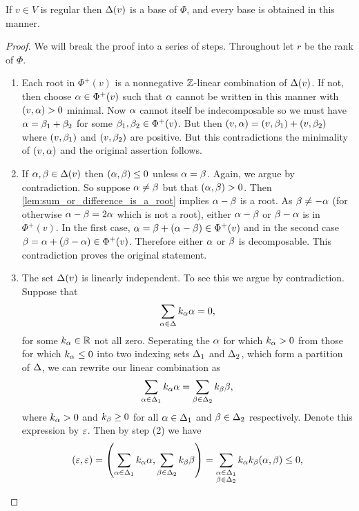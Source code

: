 \documentclass[12pt,reqno,oneside]{amsart}
\begin{document}
    \begin{theorem}\label{thm:root_system_base}
        If $v \in V$ is regular then $\Delta(v)$ is a base of $\Phi$, and every base is obtained in this manner.
    \end{theorem}
    \begin{proof}
        We will break the proof into a series of steps. Throughout let $r$ be the rank of $\Phi$.
        \begin{enumerate}
            \item Each root in $\Phi^{+}(v)$ is a nonnegative $\mathbb{Z}$-linear combination of $\Delta(v)$. If not, then choose $\alpha \in \Phi^{+}(v)$ such that $\alpha$ cannot be written in this manner with $(v,\alpha) > 0$ minimal. Now $\alpha$ cannot itself be indecomposable so we must have $\alpha = \beta_{1}+\beta_{2}$ for some $\beta_{1},\beta_{2} \in \Phi^{+}(v)$. But then $(v,\alpha) = (v,\beta_{1})+(v,\beta_{2})$ where $(v,\beta_{1})$ and $(v,\beta_{2})$ are positive. But this contradictions the minimality of $(v,\alpha)$ and the original assertion follows.
            \item If $\alpha,\beta \in \Delta(v)$ then $(\alpha,\beta) \le 0$ unless $\alpha = \beta$. Again, we argue by contradiction. So suppose $\alpha \neq \beta$ but that $(\alpha,\beta) > 0$. Then \cref{lem:sum_or_difference_is_a_root} implies $\alpha-\beta$ is a root. As $\beta \neq -\alpha$ (for otherwise $\alpha-\beta = 2\alpha$ which is not a root), either $\alpha-\beta$ or $\beta-\alpha$ is in $\Phi^{+}(v)$. In the first case, $\alpha = \beta+(\alpha-\beta) \in \Phi^{+}(v)$ and in the second case $\beta = \alpha+(\beta-\alpha) \in \Phi^{+}(v)$. Therefore either $\alpha$ or $\beta$ is decomposable. This contradiction proves the original statement.
            \item The set $\Delta(v)$ is linearly independent. To see this we argue by contradiction. Suppose that
            \[
                \sum_{\alpha \in \Delta}k_{\alpha}\alpha = 0,
            \]
            for some $k_{\alpha} \in \mathbb{R}$ not all zero. Seperating the $\alpha$ for which $k_{\alpha} > 0$ from those for which $k_{\alpha} \le 0$ into two indexing sets $\Delta_{1}$ and $\Delta_{2}$, which form a partition of $\Delta$, we can rewrite our linear combination as
            \[
                \sum_{\alpha \in \Delta_{1}}k_{\alpha}\alpha = \sum_{\beta \in \Delta_{2}}k_{\beta}\beta,
            \]
            where $k_{\alpha} > 0$ and $k_{\beta} \ge 0$ for all $\alpha \in \Delta_{1}$ and $\beta \in \Delta_{2}$ respectively. Denote this expression by $\varepsilon$. Then by step (2) we have
            \[
                (\varepsilon,\varepsilon) = \left(\sum_{\alpha \in \Delta_{1}}k_{\alpha}\alpha,\sum_{\beta \in \Delta_{2}}k_{\beta}\beta\right) = \sum_{\substack{\alpha \in \Delta_{1} \\ \beta \in \Delta_{2}}}k_{\alpha}k_{\beta}(\alpha,\beta) \le 0,
\]
\end{enumerate}
\end{proof}
\end{document}
